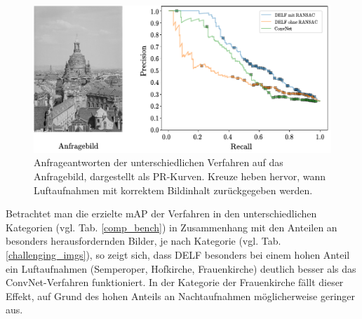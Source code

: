 \begin{figure}[h]
\centering
\includegraphics[scale=1.0]{aerial_pr}
\caption{Anfrageantworten der unterschiedlichen Verfahren auf das Anfragebild, dargestellt als PR-Kurven. Kreuze heben hervor, wann Luftaufnahmen mit korrektem Bildinhalt zurückgegeben werden.}
\label{aerial_pr}
\end{figure}
Betrachtet man die erzielte mAP der Verfahren in den unterschiedlichen Kategorien (vgl. Tab. \ref{comp_bench}) in Zusammenhang mit den Anteilen an besonders herausfordernden Bilder, je nach Kategorie (vgl. Tab. \ref{challenging_imgs}), so zeigt sich, dass DELF besonders bei einem hohen Anteil ein Luftaufnahmen (Semperoper, Hofkirche, Frauenkirche) deutlich besser als das ConvNet-Verfahren funktioniert. In der Kategorie der Frauenkirche fällt dieser Effekt, auf Grund des hohen Anteils an Nachtaufnahmen möglicherweise geringer aus.